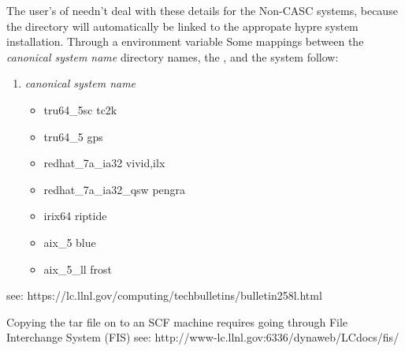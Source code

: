 \begin{enumerate}
   The user's of \hypre{} needn't deal with these details for the 
   Non-CASC systems, because the  directory
   will automatically be linked to the appropate hypre system 
   installation. Through a  environment variable
   Some mappings between the  
   \textit{canonical system name} directory names, the
   , and the system  follow:
\begin{enumerate}
   \item \textit{canonical system name}     
   \begin{itemize}
   \item  {}        tru64\_5sc           tc2k
   \item  {}        tru64\_5             gps
   \item  {}           redhat\_7a\_ia32      vivid,ilx
   \item  {}    redhat\_7a\_ia32\_qsw  pengra
   \item  {}            irix64              riptide
   \item  {}      aix\_5               blue
   \item  {}    aix\_5\_ll            frost
   \end{itemize}
\end{enumerate}
   see: 
{https://lc.llnl.gov/computing/techbulletins/bulletin258l.html}

   Copying the tar file on to an SCF machine requires going through
   File Interchange System (FIS) see: 
{http://www-lc.llnl.gov:6336/dynaweb/LCdocs/fis/}


\end{enumerate}
